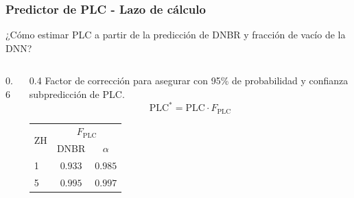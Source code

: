 \documentclass{beamer}
\begin{document}
\begin{frame}
    \frametitle{Predictor de PLC - Lazo de cálculo}
    ¿Cómo estimar PLC a partir de la predicción de DNBR y fracción de vacío de la DNN?
    \vspace{0.5cm}

    \begin{columns}
        \begin{column}{0.6\textwidth}
            \centering
            \resizebox{!}{0.8\textwidth}{
                
            }
        \end{column}
        \begin{column}{0.4\textwidth}
            Factor de corrección para asegurar con 95\% de probabilidad y confianza subpredicción de PLC.
            \begin{equation*}
                \mathrm{PLC}^* = \mathrm{PLC} \cdot F_\mathrm{PLC}
            \end{equation*}
            \begin{table}
                \centering
                \small
                \begin{tabular}{l c c} 
                    \toprule 
                    \multirow{2}{*}{ZH} & \multicolumn{2}{c}{$F_\mathrm{PLC}$} \\
                    & DNBR & $\alpha$ \\ \hline
                    1 & $0.933$ & $0.985$ \\
                    5 & $0.995$ & $0.997$ \\
                    \bottomrule
                \end{tabular}
            \end{table}
        \end{column}
    \end{columns}
\end{frame}


\end{document}
